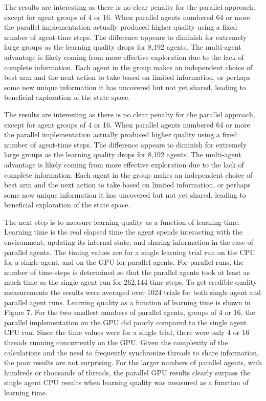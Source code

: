 \documentclass[11pt]{article} %
\begin{document}
\begin{flushleft}

The results are interesting as there is no clear penalty for the parallel approach, except for agent groups of 4 or 16.  When parallel agents numbered 64 or more the parallel implementation actually produced higher quality using a fixed number of agent-time steps.  The difference appears to diminish for extremely large groups as the learning quality drops for 8,192 agents.  The multi-agent advantage is likely coming from more effective exploration due to the lack of complete information.  Each agent in the group makes an independent choice of best arm and the next action to take based on limited information, or perhaps some new unique information it has uncovered but not yet shared, leading to beneficial exploration of the state space.

The results are interesting as there is no clear penalty for the parallel approach, except for agent groups of 4 or 16.  When parallel agents numbered 64 or more the parallel implementation actually produced higher quality using a fixed number of agent-time steps.  The difference appears to diminish for extremely large groups as the learning quality drops for 8,192 agents.  The multi-agent advantage is likely coming from more effective exploration due to the lack of complete information.  Each agent in the group makes an independent choice of best arm and the next action to take based on limited information, or perhaps some new unique information it has uncovered but not yet shared, leading to beneficial exploration of the state space.

The next step is to measure learning quality as a function of learning time.  Learning time is the real elapsed time the agent spends interacting with the environment, updating its internal state, and sharing information in the case of parallel agents.  The timing values are for a single learning trial run on the CPU for a single agent, and on the GPU for parallel agents. For parallel runs, the number of time-steps is determined so that the parallel agents took at least as much time as the single agent run for 262,144 time steps.  To get credible quality measurements the results were averaged over 1024 trials for both single agent and parallel agent runs.  Learning quality as a function of learning time is shown in Figure 7.  For the two smallest numbers of parallel agents, groups of 4 or 16, the parallel implementation on the GPU did poorly compared to the single agent CPU run.  Since the time values were for a single trial, there were only 4 or 16 threads running concurrently on the GPU.  Given the complexity of the calculations and the need to frequently synchronize threads to share information, the poor results are not surprising.  For the larger numbers of parallel agents, with hundreds or thousands of threads, the parallel GPU results clearly surpass the single agent CPU results when learning quality was measured as a function of learning time.

\end{flushleft}
\end{document}
